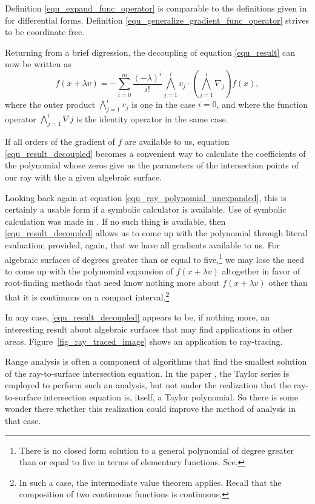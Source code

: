 \documentclass{birkjour}
\theoremstyle{definition}
\theoremstyle{remark}
\numberwithin{equation}{section}
\begin{document}
Definition \eqref{equ_expand_func_operator} is comparable to the
definitions given in \cite{Hestenes93,Macdonald12} for differential forms.
Definition \eqref{equ_generalize_gradient_func_operator} strives to be coordinate free.

Returning from a brief digression, the decoupling of equation \eqref{equ_result} can now be written as
\begin{equation}\label{equ_result_decoupled}
f(x+\lambda v) = -\sum_{i=0}^m\frac{(-\lambda)^i}{i!}\bigwedge_{j=1}^i v_j\cdot\left(\bigwedge_{j=1}^i\nabla_j\right)f(x),
\end{equation}
where the outer product $\bigwedge_{j=1}^i v_j$ is one in the case $i=0$, and where the function
operator $\bigwedge_{j=1}^i\nabla j$ is the identity operator in the same case.

If all orders of the gradient of $f$ are available to us, equation \eqref{equ_result_decoupled} becomes
a convenient way to calculate the coefficients of the polynomial whose zeros give us the parameters of
the intersection points of our ray with the a given algebraic surface.

Looking back again at equation \eqref{equ_ray_polynomial_unexpanded}, this is certainly a usable form
if a symbolic calculator is available.  Use of symbolic calculation was made in \cite{Hanrahan83}.  If no such
thing is available, then \eqref{equ_result_decoupled} allows us to come up with the polynomial
through literal evaluation; provided, again, that we have all gradients available to us.
For algebraic surfaces of degrees greater than or equal to five,\footnote{There is no closed form solution
to a general polynomial of degree greater than or equal to five in terms of elementary functions.  See\cite{Gallian12}.} we may
lose the need to come up
with the polynomial expansion of $f(x+\lambda v)$ altogether in favor of root-finding methods
that need know nothing more about $f(x+\lambda v)$ other than that it is continuous on
a compact interval.\footnote{In such a
case, the intermediate value theorem applies.  Recall that the composition of two continuous functions
is continuous.}

In any case, \eqref{equ_result_decoupled} appears to be, if nothing more, an
interesting result about algebraic surfaces that may find applications in other areas.
Figure~\ref{fig_ray_traced_image} shows an application to ray-tracing.

Range analysis is often a component of algorithms that find the smallest
solution of the ray-to-surface intersection equation.  In the paper \cite{Shou06},
the Taylor series is employed to perform such an analysis, but not under
the realization that the ray-to-surface intersection equation is, itself, a
Taylor polynomial.  So there is some wonder there whether this realization
could improve the method of analysis in that case.



\end{document}
